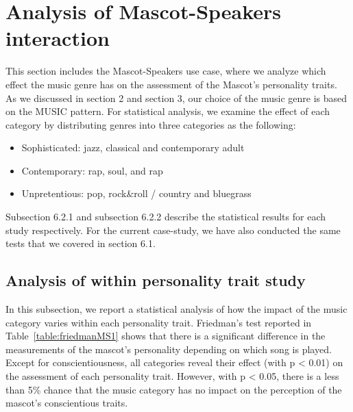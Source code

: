 \section{Analysis of Mascot-Speakers interaction}
\label{M-S}
This section includes the Mascot-Speakers use case, where we analyze which effect the music genre has on the assessment of the Mascot’s personality traits. As we discussed in section 2 and section 3, our choice of the music genre is based on the MUSIC pattern. For statistical analysis, we examine the effect of each category by distributing genres into three categories as the following:
\begin{itemize}
  \item Sophisticated:  jazz, classical and contemporary adult
  \item Contemporary: rap, soul, and rap
  \item Unpretentious: pop, rock\&roll / country and bluegrass
\end{itemize}

Subsection 6.2.1 and subsection 6.2.2 describe the statistical results for each study respectively. For the current case-study, we have also conducted the same tests that we covered in section 6.1. 

\subsection{Analysis of within personality trait study}
\label{Study1(M-S)}
In this subsection, we report a statistical analysis of how the impact of the music category varies within each personality trait. Friedman’s test reported in Table~\ref{table:friedmanMS1} shows that there is a significant difference in the measurements of the mascot’s personality depending on which song is played. Except for conscientiousness, all categories reveal their effect (with p < 0.01) on the assessment of each personality trait. However, with p < 0.05, there is a less than 5\% chance that the music category has no impact on the perception of the mascot’s conscientious traits.

